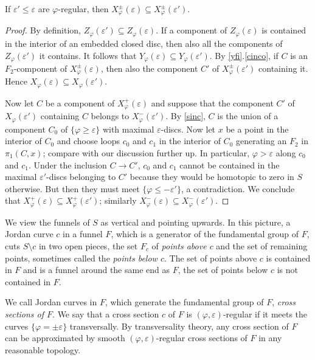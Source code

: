 \begin{lem}\label{euler0}
If ${\varepsilon}'\le{\varepsilon}$ are ${\varphi}$-regular, then $X_{\varphi}^\pm({\varepsilon})\subseteq X_{\varphi}^\pm({\varepsilon}')$.
\end{lem}

\begin{proof}
By definition, $Z_{\varphi}({\varepsilon}')\subseteq Z_{\varphi}({\varepsilon})$.
If a component of $Z_{\varphi}({\varepsilon})$
is contained in the interior of an embedded closed disc,
then also all the components of $Z_{\varphi}({\varepsilon}')$ it contains.
It follows that $Y_{\varphi}({\varepsilon})\subseteq Y_{\varphi}({\varepsilon}')$.
By \cref{yfi}.\ref{cinco}, if $C$ is an $F_2$-component of $X_{\varphi}^\pm({\varepsilon})$,
then also the component $C'$ of $X_{\varphi}^\pm({\varepsilon}')$ containing it. 
Hence $X_{\varphi}({\varepsilon})\subseteq X_{\varphi}({\varepsilon}')$.

Now let $C$ be a component of $X_{\varphi}^+({\varepsilon})$
and suppose that the component $C'$ of $X_{\varphi}({\varepsilon}')$ 
containing $C$ belongs to $X_{\varphi}^-({\varepsilon}')$.
By \cref{sinc}, $C$ is the union of a component $C_0$ of $\{{\varphi}\ge{\varepsilon}\}$
with maximal ${\varepsilon}$-discs.
Now let $x$ be a point in the interior of $C_0$ and choose loops $c_0$ and $c_1$
in the interior of $C_0$ generating an $F_2$ in $\pi_1(C,x)$;
compare with our discussion further up.
In particular, ${\varphi}>{\varepsilon}$ along $c_0$ and $c_1$.
Under the inclusion $C\to C'$,
$c_0$ and $c_1$ cannot be contained in the maximal ${\varepsilon}'$-discs belonging to $C'$
because they would be homotopic to zero in $S$ otherwise.
But then they must meet $\{{\varphi}\le-{\varepsilon}'\}$, a contradiction.
We conclude that $X_{\varphi}^+({\varepsilon})\subseteq X_{\varphi}^+({\varepsilon}')$;
similarly $X_{\varphi}^-({\varepsilon})\subseteq X_{\varphi}^-({\varepsilon}')$.
\end{proof}

We view the funnels of $S$ as vertical and pointing upwards.
In this picture, a Jordan curve $c$ in a funnel $F$,
which is a generator of the fundamental group of $F$,
cuts $S\setminus c$ in two open pieces,
the set $F_c$ of \emph{points above $c$} and the set of remaining points,
sometimes called the \emph{points below $c$}.
The set of points above $c$ is contained in $F$ and is a funnel around the same end as $F$,
the set of points below $c$ is not contained in $F$.

We call Jordan curves in $F$, which generate the fundamental group of $F$,
\emph{cross sections of $F$}.
We say that a cross section $c$ of $F$ is $({\varphi},{\varepsilon})$-regular
if it meets the curves $\{{\varphi}=\pm{\varepsilon}\}$ transversally.
By transversality theory, any cross section of $F$ can be approximated
by smooth $({\varphi},{\varepsilon})$-regular cross sections of $F$ in any reasonable topology.

